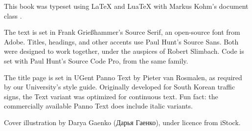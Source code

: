 \documentclass[main]{subfiles}
\begin{document}
\vspace*{\fill}

\begin{small}
    This book was typeset using {\LaTeX} and {Lua\TeX} with Markus Kohm's document class {\KOMAScript}.

    The text is set in Frank Grießhammer's Source Serif, an open-source font from Adobe.
    Titles, headings, and other accents use Paul Hunt's {\sffamily Source Sans}.
    Both were designed to work together, under the auspices of Robert Slimbach.
    Code is set with Paul Hunt's {\ttfamily Source Code Pro}, from the same family.

    The title page is set in {\panno\selectfont UGent Panno Text} by Pieter van Rosmalen,
    as required by our University's style guide.
    Originally developed for South Korean traffic signs, the Text variant was optimized for continuous text.
    Fun fact: the commercially available Panno Text does include italic variants.

    Cover illustration by Darya Gaenko (Дарья Гаенко), under licence from iStock.
\end{small}
\end{document}
